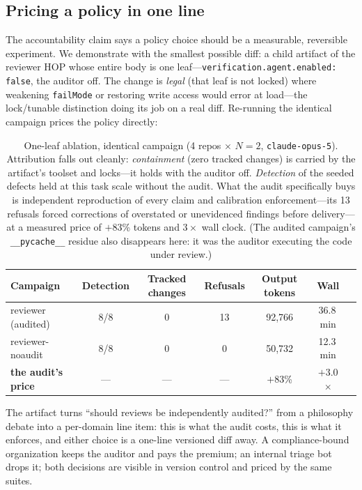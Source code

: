 \documentclass[10pt]{article}
\begin{document}
\subsection{Pricing a policy in one line}

The accountability claim says a policy choice should be a measurable, reversible experiment. We
demonstrate with the smallest possible diff: a child artifact of the reviewer HOP whose entire body is
one leaf---\texttt{verification.agent.enabled: false}, the auditor off. The change is \emph{legal}
(that leaf is not locked) where weakening \texttt{failMode} or restoring write access would error at
load---the lock/tunable distinction doing its job on a real diff. Re-running the identical campaign
prices the policy directly:

\begin{table}[h]
\centering\small
\begin{tabular}{lcccccc}
\toprule
Campaign & Detection & Tracked changes & Refusals & Output tokens & Wall & \\
\midrule
reviewer (audited) & 8/8 & 0 & 13 & 92{,}766 & 36.8\,min & \\
reviewer-noaudit & 8/8 & 0 & 0 & 50{,}732 & 12.3\,min & \\
\midrule
\textbf{the audit's price} & --- & --- & --- & $+$83\% & $+$3.0$\times$ & \\
\bottomrule
\end{tabular}
\caption{One-leaf ablation, identical campaign (4 repos $\times$ $N{=}2$, \texttt{claude-opus-5}).
Attribution falls out cleanly: \emph{containment} (zero tracked changes) is carried by the artifact's
toolset and locks---it holds with the auditor off. \emph{Detection} of the seeded defects held at this
task scale without the audit. What the audit specifically buys is independent reproduction of every
claim and calibration enforcement---its 13 refusals forced corrections of overstated or unevidenced
findings before delivery---at a measured price of $+$83\% tokens and $3\times$ wall clock. (The
audited campaign's \texttt{\_\_pycache\_\_} residue also disappears here: it was the auditor executing
the code under review.)}
\label{tab:ablation}
\end{table}

The artifact turns ``should reviews be independently audited?'' from a philosophy debate into a
per-domain line item: this is what the audit costs, this is what it enforces, and either choice is a
one-line versioned diff away. A compliance-bound organization keeps the auditor and pays the
premium; an internal triage bot drops it; both decisions are visible in version control and priced by
the same suites.
\end{document}
